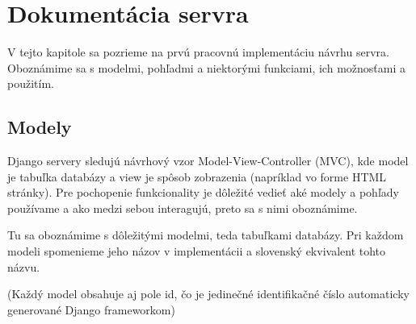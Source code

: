 \chapter{Dokumentácia servra}
\label{kap:doc}



V tejto kapitole sa pozrieme na prvú pracovnú implementáciu návrhu servra. Oboznámime sa
s modelmi, pohľadmi a niektorými funkciami, ich možnosťami a použitím.
\section{Modely}
\label{modely}
Django servery sledujú návrhový vzor Model-View-Controller (MVC), kde model je tabuľka
databázy a view je spôsob zobrazenia (napríklad vo forme HTML stránky). Pre pochopenie
funkcionality je dôležité vedieť aké modely a pohľady používame a ako medzi sebou interagujú,
preto sa s nimi oboznámime.

Tu sa oboznámime s dôležitými modelmi, teda tabuľkami databázy.
Pri každom modeli spomenieme jeho názov v implementácii a slovenský ekvivalent tohto názvu.

(Každý model obsahuje aj pole id, čo je jedinečné identifikačné číslo automaticky generované
Django frameworkom)
